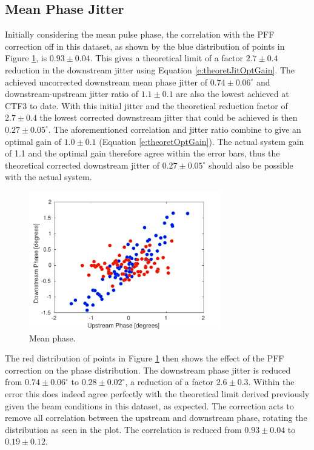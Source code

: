 \subsection{Mean Phase Jitter}
\label{ss:bestMeanJitter}

Initially considering the mean pulse phase, the correlation with the PFF correction off 
in this dataset, as shown by the blue distribution of points in Figure 
\ref{f:BestFF_Real}, is \(0.93\pm0.04\). This gives a theoretical limit of a factor 
\(2.7\pm0.4\) reduction in the downstream jitter using Equation 
\ref{e:theoretJitOptGain}. The achieved uncorrected downstream mean phase jitter of 
\(0.74\pm0.06^\circ\) and downstream-upstream jitter ratio of \(1.1\pm0.1\) are also the lowest achieved at CTF3 to date. With this initial jitter and the theoretical reduction 
factor of \(2.7\pm0.4\) the lowest corrected downstream jitter that could be achieved is then \(0.27\pm0.05^\circ\). The aforementioned correlation and jitter ratio combine to 
give an optimal gain of \(1.0\pm0.1\) (Equation \ref{e:theoretOptGain}). The actual 
system gain of 1.1 and the optimal gain therefore agree within the error bars, thus the 
theoretical corrected downstream jitter of \(0.27\pm0.05^\circ\) should also be possible with the actual system.


\begin{figure}
  \centering
  \includegraphics[width=0.75\textwidth]{Figures/feedforward/BestFF_Real}
  \caption{Mean phase.}
  \label{f:BestFF_Real}
\end{figure}

The red distribution of points in Figure \ref{f:BestFF_Real} then shows the effect of 
the PFF correction on the phase distribution. The downstream phase jitter is reduced 
from \(0.74\pm0.06^\circ\) to \(0.28\pm0.02^\circ\), a reduction of a factor 
\(2.6\pm0.3\).  Within the error this does indeed agree perfectly with the theoretical 
limit derived previously given the beam conditions in this dataset, as expected. The 
correction acts to remove all correlation between the upstream and downstream phase, 
rotating the distribution as seen in the plot. The correlation is reduced from 
\(0.93\pm0.04\) to \(0.19\pm0.12\). 


